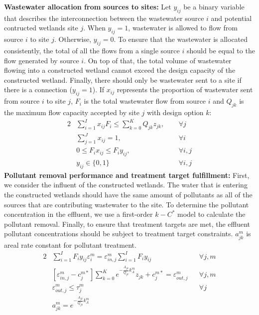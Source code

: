 \documentclass[preprint,12pt,authoryear]{elsarticle}
\begin{document}
\textbf{Wastewater allocation from sources to sites:} Let $y_{ij}$ be a binary variable that describes the interconnection between the wastewater source $i$ and potential contructed wetlands site $j$. When $y_{ij} = 1$, wastewater is allowed to flow from source $i$ to site $j$. Otherwise, $y_{ij} = 0$. To ensure that the wastewater is allocated consistently, the total of all the flows from a single source $i$ should be equal to the flow generated by source $i$. On top of that, the total volume of wastewater flowing into a constructed wetland cannot exceed the design capacity of the constructed wetland. Finally, there should only be wastewater sent to a site if there is a connection ($y_{ij} = 1$). If $x_{ij}$ represents the proportion of wastewater sent from source $i$ to site $j$, $F_{i}$ is the total wastewater flow from source $i$ and $Q_{jk}$ is the maximum flow capacity accepted by site $j$ with design option $k$:
\begin{alignat*}{2}
    &\sum_{i=1}^{I}x_{ij}F_{i}\leq \sum_{k=0}^{K}Q_{jk}z_{jk},~~ &&\forall j\label{eq:CWcapacity}\\
	&\sum_{j=1}^{J}x_{ij}=1, &&\forall i \nonumber\\
	&0 \leq F_ix_{ij}\leq F_iy_{ij},&&\forall i,j\nonumber\\
	& y_{ij}\in\{0,1\}&&\forall i,j\nonumber
\end{alignat*}
\textbf{Pollutant removal performance and treatment target fulfillment:} First, we consider the influent of the constructed wetlands. The water that is entering the constructed wetlands should have the same amount of pollutants as all of the sources that are contributing wastewater to the site. To determine the pollutant concentration in the effluent, we use a first-order $k-C^*$ model \citep{rousseau2004model} to calculate the pollutant removal. Finally, to ensure that treatment targets are met, the effluent pollutant concentrations should be subject to treatment target constraints. $a_{jk}^m$ is areal rate constant for pollutant treatment. 
\begin{alignat*}{2}
	&{\sum_{i=1}^{I}F_{i}y_{ij}\varepsilon_{i}^{m}} = \varepsilon_{in,j}^{m}{\sum_{i=1}^{I}F_{i}y_{ij}} &&\forall j,m\\
	&[\varepsilon_{in,j}^{m}-{c}_{j}^{m*}]\sum_{k=0}^{K}e^{-\frac{A_{jk}}{Q_{jk}}k_{A}^{m}}z_{jk}+c_{j}^{m*} = \varepsilon_{out,j}^{m} &&\forall j,m\\
	&\varepsilon_{out,j}^{m}\leq \tau_{j}^{m}~~~&&\forall j\\
	&a_{jk}^m = e^{-\frac{A_{jk}}{Q_{jk}}k_{A}^{m}}\\
\end{alignat*}
\end{document}
